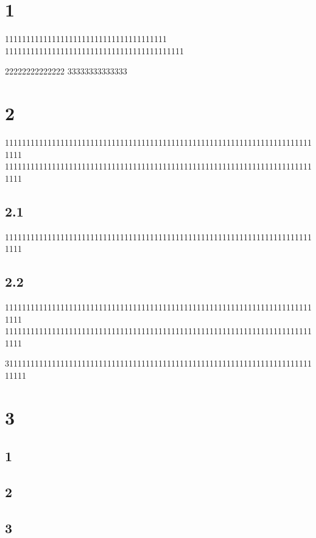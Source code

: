 \documentclass[UTF8]{ctexart}
\begin{document}
\tableofcontents\thispagestyle{empty}
\newpage
\setcounter{page}{1}
\section{1}
\vskip 1cm

11111111111111111111111111111111111111
111111111111111111111111111111111111111111

\vskip 2cm
22222222222222
\vskip 1cm
33333333333333

\vskip 2cm
\section{2}

1111111111111111111111111111111111111111111111111111111111111111111111111111
1111111111111111111111111111111111111111111111111111111111111111111111111111

\subsection{2.1}


1111111111111111111111111111111111111111111111111111111111111111111111111111


\vskip 1cm

\subsection{2.2}


1111111111111111111111111111111111111111111111111111111111111111111111111111
1111111111111111111111111111111111111111111111111111111111111111111111111111

31111111111111111111111111111111111111111111111111111111111111111111111111111

\vskip 3cm
\section{3}


\subsection{1}
\subsection{2}
\subsection{3}
\end{document}
